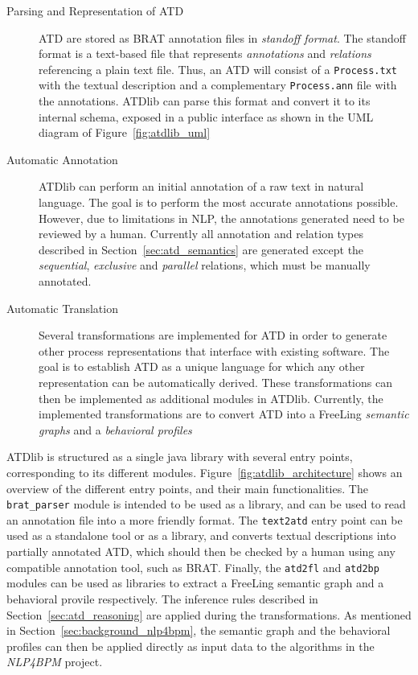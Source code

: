\begin{description}
  \item[Parsing and Representation of ATD]{ATD are stored as BRAT annotation
      files in \emph{standoff format}\cite{brat_standoff}. The standoff format
      is a text-based file that represents \emph{annotations} and
      \emph{relations} referencing a plain text file. Thus, an ATD will consist
      of a \texttt{Process.txt} with the textual description and a complementary
      \texttt{Process.ann} file with the annotations. ATDlib can parse this
      format and convert it to its internal schema, exposed in a public
      interface as shown in the UML diagram of Figure~\ref{fig:atdlib_uml}}
  \item[Automatic Annotation]{ATDlib can perform an initial annotation of a raw
      text in natural language. The goal is to perform the most accurate
      annotations possible. However, due to limitations in NLP, the annotations
      generated need to be reviewed by a human. Currently all annotation and
      relation types described in Section~\ref{sec:atd_semantics} are generated
      except the \emph{sequential}, \emph{exclusive} and \emph{parallel}
      relations, which must be manually annotated.}
  \item[Automatic Translation]{Several transformations are implemented for ATD
      in order to generate other process representations that interface with
      existing software. The goal is to establish ATD as a unique language for
      which any other representation can be automatically derived. These
      transformations can then be implemented as additional modules in ATDlib.
      Currently, the implemented transformations are to convert ATD into a
      FreeLing\cite{PadroS12} \emph{semantic graphs} and a \emph{behavioral
        profiles}\cite{smirnov2010business}}
    
\end{description}


ATDlib is structured as a single java library with several entry points,
corresponding to its different modules. Figure~\ref{fig:atdlib_architecture}
shows an overview of the different entry points, and their main functionalities.
The \texttt{brat\_parser} module is intended to be used as a library, and can be
used to read an annotation file into a more friendly format. The \texttt{text2atd}
entry point can be used as a standalone tool or as a library, and converts
textual descriptions into partially annotated ATD, which should then be checked
by a human using any compatible annotation tool, such as BRAT. Finally, the
\texttt{atd2fl} and \texttt{atd2bp} modules can be used as libraries to extract
a FreeLing semantic graph and a behavioral provile respectively. The inference
rules described in Section~\ref{sec:atd_reasoning} are applied during the
transformations. As mentioned in Section~\ref{sec:background_nlp4bpm}, the
semantic graph and the behavioral profiles can then be applied directly as input
data to the algorithms in the \emph{NLP4BPM} project.


